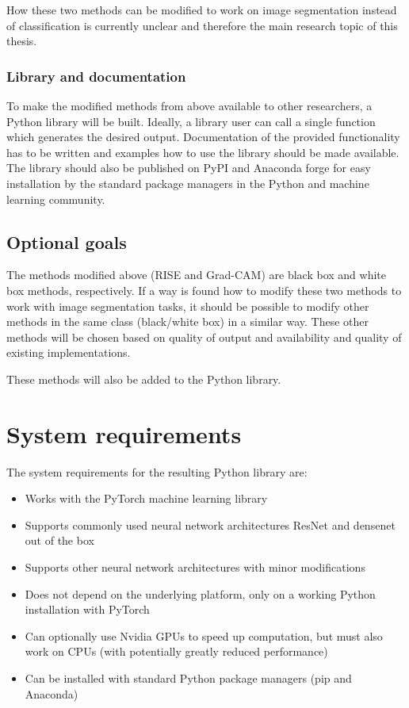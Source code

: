 How these two methods can be modified to work on image segmentation instead of classification is currently unclear and therefore the main research topic of this thesis.

\subsubsection{Library and documentation}
To make the modified methods from above available to other researchers, a Python library will be built. Ideally, a library user can call a single function
which generates the desired output. Documentation of the provided functionality has to be written and examples how to use the library should be made available. The library should also be published on PyPI and Anaconda forge for easy installation by the standard package managers in the
Python and machine learning community.

\subsection{Optional goals}
The methods modified above (RISE and Grad-CAM) are black box and white box methods, respectively.
If a way is found how to modify these two methods to work with image segmentation tasks, it should be possible to modify other
methods in the same class (black/white box) in a similar way. These other methods will be chosen based on quality of output and availability and quality of existing implementations.

These methods will also be added to the Python library.

\section{System requirements}
The system requirements for the resulting Python library are:

\begin{itemize}
    \item Works with the PyTorch machine learning library
    \item Supports commonly used neural network architectures ResNet and densenet out of the box
    \item Supports other neural network architectures with minor modifications
    \item Does not depend on the underlying platform, only on a working Python installation with PyTorch
    \item Can optionally use Nvidia GPUs to speed up computation, but must also work on CPUs (with potentially greatly reduced performance)
    \item Can be installed with standard Python package managers (pip and Anaconda)
\end{itemize}

